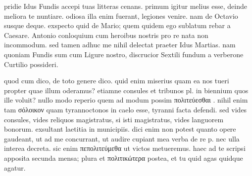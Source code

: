 


 pridie Idus Fundis accepi tuas litteras cenans. primum igitur melius esse, deinde meliora te nuntiare. odiosa illa enim fuerant, legiones venire. nam de Octavio susque deque. exspecto quid de Mario; quem quidem ego sublatum rebar a Caesare. Antonio conloquium cum heroibus nostris pro re nata non incommodum. sed tamen adhuc me nihil delectat praeter Idus Martias. nam quoniam Fundis sum cum Ligure nostro, discrucior Sextili fundum a verberone Curtilio possideri.

 quod cum dico, de toto genere dico. quid enim miserius quam ea nos tueri propter quae illum oderamus? etiamne consules et tribunos pl. in biennium quos ille voluit? nullo modo reperio quem ad modum possim πολιτεύεσθαι . nihil enim tam σόλοικον quam tyrannoctonos in caelo esse, tyranni facta defendi. sed vides consules, vides reliquos magistratus, si isti magistratus, vides languorem bonorum. exsultant laetitia in municipiis. dici enim non potest quanto opere gaudeant, ut ad me concurrant, ut audire cupiant mea verba de re p. nec ulla interea decreta. sic enim πεπολιτεύμεθα ut victos metueremus. haec ad te scripsi apposita secunda mensa; plura et πολιτικώτερα postea, et tu quid agas quidque agatur.
